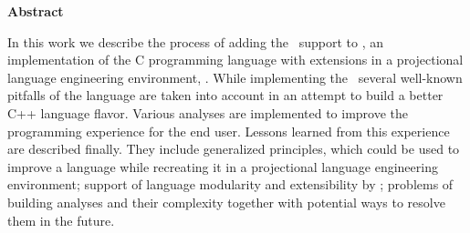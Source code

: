 

\clearemptydoublepage
{}
{}	





\vspace*{2cm}
\begin{center}
{\Large \bf Abstract}
\end{center}
\vspace{1cm}

In this work we describe the process of adding the \cpppl\ support to \mbdp, an implementation of the
C programming language with extensions in a projectional language engineering environment, \jbmps. 
While implementing the \cpppl\ several well-known pitfalls of the language are taken into account
in an attempt to build a better C++ language flavor. Various analyses are implemented to improve
the programming experience for the end user. Lessons learned from this experience are described finally.
They include generalized principles, which could be used to improve a language while recreating it in a 
projectional language engineering environment; support of language modularity and extensibility  by \jbmps;
problems of building analyses and their complexity together with potential ways to resolve them in the future.